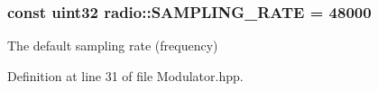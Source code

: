 \hypertarget{namespaceradio_a284213fea4beed2f74bb936927cbe654}{
\subsubsection[{S\+A\+M\+P\+L\+I\+N\+G\+\_\+\+R\+A\+T\+E}]{\setlength{\rightskip}{0pt plus 5cm}const {\bf uint32} radio\+::\+S\+A\+M\+P\+L\+I\+N\+G\+\_\+\+R\+A\+T\+E = 48000}}\label{namespaceradio_a284213fea4beed2f74bb936927cbe654}
The default sampling rate (frequency) 

Definition at line 31 of file Modulator.\+hpp.

